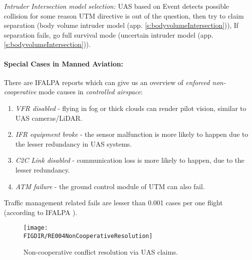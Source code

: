 \begin{note}
    \emph{Intruder Intersection model selection:} UAS based on Event detects possible collision for some reason UTM directive is out of the question, then try to claim separation (body volume intruder model (app. \ref{s:bodyvolumeIntersection})), If separation fails, go full survival mode (uncertain intruder model (app. \ref{s:bodyvolumeIntersection})).
\end{note}

\paragraph{Special Cases in Manned Aviation:} There are IFALPA reports which can give us an overview of \emph{enforced non-cooperative} mode causes in \emph{controlled airspace}:  
\begin{enumerate}
    \item \emph{VFR disabled} - flying in fog or thick clouds can render pilot vision, similar to UAS cameras/LiDAR.
    
    \item \emph{IFR equipment broke} - the sensor malfunction is more likely to happen due to the lesser redundancy in UAS systems.
    
    \item \emph{C2C Link disabled} - communication loss is more likely to happen, due to the lesser redundancy.
    
    \item \emph{ATM failure} - the ground control module of UTM can also fail.
\end{enumerate}

\begin{note}
    Traffic management related fails are lesser than 0.001 cases per one flight (according to IFALPA \cite{subotic2007recovery}).
\end{note}

\begin{figure}[H]
    \centering
    \texttt{[image: \\FIGDIR/RE004NonCooperativeResolution]} 
    \caption{Non-cooperative conflict resolution via UAS claims.}
    \label{fig:NonCooperativeConflictResolutionUTM}
\end{figure}

